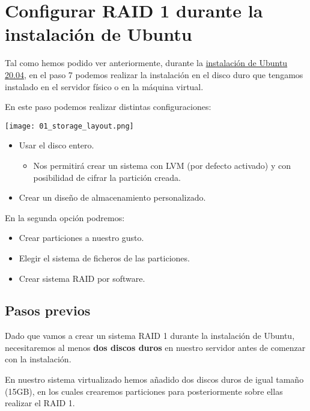 \chapter{Configurar RAID 1 durante la instalación de Ubuntu}

Tal como hemos podido ver anteriormente, durante la \hyperlink{instalar_ubuntu_lts}{instalación de Ubuntu 20.04}, en el paso 7 podemos realizar la instalación en el disco duro que tengamos instalado en el servidor físico o en la máquina virtual.

En este paso podemos realizar distintas configuraciones:

\begin{center}
    \vspace{-15pt}
    \texttt{[image: 01\_storage\_layout.png]}
    \vspace{-10pt}
\end{center}

\begin{itemize}
    \item Usar el disco entero.
    \begin{itemize}
        \item Nos permitirá crear un sistema con LVM (por defecto activado) y con posibilidad de cifrar la partición creada.
    \end{itemize}
    \item Crear un diseño de almacenamiento personalizado.
\end{itemize}

    En la segunda opción podremos:
\begin{itemize}
    \item  Crear particiones a nuestro gusto.
    \item  Elegir el sistema de ficheros de las particiones.
    \item  Crear sistema RAID por software.
\end{itemize}


\section{Pasos previos}
Dado que vamos a crear un sistema RAID 1 durante la instalación de Ubuntu, necesitaremos al menos \textbf{dos discos duros} en nuestro servidor antes de comenzar con la instalación.

En nuestro sistema virtualizado hemos añadido dos discos duros de igual tamaño (15GB), en los cuales crearemos particiones para posteriormente sobre ellas realizar el RAID 1.

